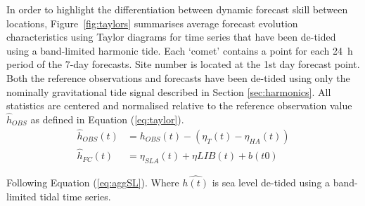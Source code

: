In order to highlight the differentiation between dynamic forecast skill between locations, Figure~\ref{fig:taylors} summarises average forecast evolution characteristics using Taylor diagrams \citep{Taylor:2000wp} for time series that have been de-tided using a band-limited harmonic tide.
Each `comet' contains a point for each 24~h period of the 7-day forecasts.
Site number is located at the 1st day forecast point.
Both the reference observations and forecasts have been de-tided using only the nominally gravitational tide signal described in Section \ref{sec:harmonics}.
All statistics are centered and normalised relative to the reference observation value $\hat{h}_{OBS}$ as defined in Equation (\ref{eq:taylor}).
\begin{equation}
\begin{split}
\hat{h}_{OBS}(t) &= h_{OBS}(t) - (\eta_{T}(t) - \eta_{HA}(t))  \\ 
\hat{h}_{FC}(t)  &= \eta_{SLA}(t) + \eta{LIB}(t) + b(t0) 
\label{eq:taylor}
\end{split}
\end{equation}

Following Equation (\ref {eq:aggSL}).  Where $\hat{h(t)}$ is sea level de-tided using a band-limited tidal time series.  

